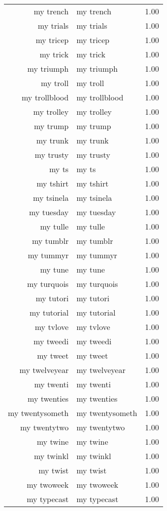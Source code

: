 \begin{table}[ht]
\begin{tabular}{rlr}
  my trench & my trench & 1.00 \\ 
  my trials & my trials & 1.00 \\ 
  my tricep & my tricep & 1.00 \\ 
  my trick & my trick & 1.00 \\ 
  my triumph & my triumph & 1.00 \\ 
  my troll & my troll & 1.00 \\ 
  my trollblood & my trollblood & 1.00 \\ 
  my trolley & my trolley & 1.00 \\ 
  my trump & my trump & 1.00 \\ 
  my trunk & my trunk & 1.00 \\ 
  my trusty & my trusty & 1.00 \\ 
  my ts & my ts & 1.00 \\ 
  my tshirt & my tshirt & 1.00 \\ 
  my tsinela & my tsinela & 1.00 \\ 
  my tuesday & my tuesday & 1.00 \\ 
  my tulle & my tulle & 1.00 \\ 
  my tumblr & my tumblr & 1.00 \\ 
  my tummyr & my tummyr & 1.00 \\ 
  my tune & my tune & 1.00 \\ 
  my turquois & my turquois & 1.00 \\ 
  my tutori & my tutori & 1.00 \\ 
  my tutorial & my tutorial & 1.00 \\ 
  my tvlove & my tvlove & 1.00 \\ 
  my tweedi & my tweedi & 1.00 \\ 
  my tweet & my tweet & 1.00 \\ 
  my twelveyear & my twelveyear & 1.00 \\ 
  my twenti & my twenti & 1.00 \\ 
  my twenties & my twenties & 1.00 \\ 
  my twentysometh & my twentysometh & 1.00 \\ 
  my twentytwo & my twentytwo & 1.00 \\ 
  my twine & my twine & 1.00 \\ 
  my twinkl & my twinkl & 1.00 \\ 
  my twist & my twist & 1.00 \\ 
  my twoweek & my twoweek & 1.00 \\ 
  my typecast & my typecast & 1.00 \\ 

\end{tabular}
\end{table}
